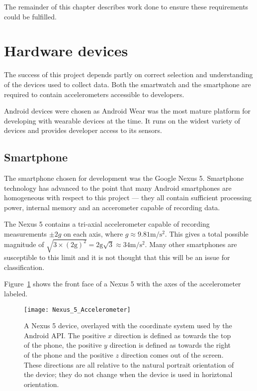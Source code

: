     The remainder of this chapter describes work done to ensure these requirements could be fulfilled.
  
  \section{Hardware devices}
    The success of this project depends partly on correct selection and understanding of the devices
    used to collect data. Both the smartwatch and the smartphone are required to contain accelerometers accessible to
    developers.
    
    Android devices were chosen as Android Wear was the most mature platform for developing with
    wearable devices at the time. It runs on the widest variety of devices and provides developer 
    access to its sensors.
    
    \subsection{Smartphone}
      The smartphone chosen for development was the Google Nexus 5. Smartphone technology has
      advanced to the point that many Android smartphones are homogeneous with respect to this
      project --- they all contain sufficient processing power, internal memory and an 
      accerometer capable of recording data.
      
      The Nexus 5 contains a tri-axial accelerometer capable of recording measurements $\pm2\si{g}$
      on each axis, where $\si{g} \approx 9.81\si{\metre\per\square\second}$. This gives a total possible magnitude of $\sqrt{3 \times (2\mathrm{g})^2} = 2\mathrm{g}\sqrt{3} \approx 34 \si{\metre\per\square\second}$. Many other smartphones are susceptible to this limit and it is not thought that this will be an issue for classification.
      
      Figure~\ref{fig:nexus-5-accelerometer} shows the front face of a Nexus 5 with the axes of the
      accelerometer labeled.
      
      \begin{figure}[!th]
        \centering
        \texttt{[image: Nexus\_5\_Accelerometer]}
        \caption{A Nexus 5 device, overlayed with the coordinate system used by the Android API. The positive $x$ direction is defined as towards the top of the phone, the positive $y$ direction is defined as towards the right of the phone and the positive $z$ direction comes out of the screen. These directions are all relative to the natural portrait orientation of the device; they do not change when the device is used in horiztonal orientation.}
        \label{fig:nexus-5-accelerometer}
      \end{figure}
      
